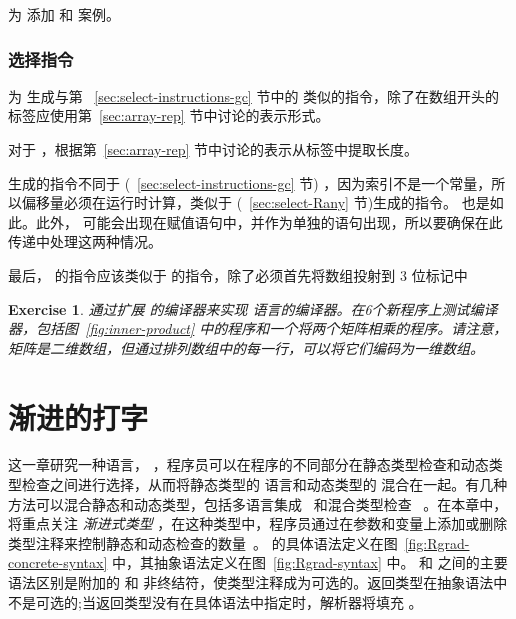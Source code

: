 \documentclass[11pt]{book}
\newtheorem{exercise}[theorem]{Exercise}
\begin{document}
为  添加  和  案例。

\subsection{选择指令}

为  生成与第 ~\ref{sec:select-instructions-gc} 节中的
 类似的指令，除了在数组开头的标签应使用第~\ref{sec:array-rep} 节中讨论的表示形式。

对于  ，根据第~\ref{sec:array-rep} 节中讨论的表示从标签中提取长度。

  生成的指令不同于  (~\ref{sec:select-instructions-gc} 节) ，因为索引不是一个常量，所以偏移量必须在运行时计算，类似于
 (~\ref{sec:select-Rany} 节)生成的指令。  也是如此。此外，  可能会出现在赋值语句中，并作为单独的语句出现，所以要确保在此传递中处理这两种情况。

最后，  的指令应该类似于  的指令，除了必须首先将数组投射到 $3$ 位标记中

\begin{exercise}\normalfont

通过扩展 \LangLoop{} 的编译器来实现 \LangArray{} 语言的编译器。在6个新程序上测试编译器，包括图~\ref{fig:inner-product} 中的程序和一个将两个矩阵相乘的程序。请注意，矩阵是二维数组，但通过排列数组中的每一行，可以将它们编码为一维数组。
  
\end{exercise}


\chapter{渐进的打字}
\label{ch:Rgrad}

这一章研究一种语言， \LangGrad{} ，程序员可以在程序的不同部分在静态类型检查和动态类型检查之间进行选择，从而将静态类型的 \LangLoop{} 语言和动态类型的 \LangDyn{} 混合在一起。有几种方法可以混合静态和动态类型，包括多语言集成~\citep{Tobin-Hochstadt:2006fk,Matthews:2007zr} 和混合类型检查~\citep{Flanagan:2006mn,Gronski:2006uq} 。在本章中，将重点关注 \emph{渐进式类型} ，在这种类型中，程序员通过在参数和变量上添加或删除类型注释来控制静态和动态检查的数量~\citep{Anderson:2002kd,Siek:2006bh}。
%
 \LangGrad{} 的具体语法定义在图~\ref{fig:Rgrad-concrete-syntax} 中，其抽象语法定义在图~\ref{fig:Rgrad-syntax} 中。
\LangLoop{} 和 \LangGrad{} 之间的主要语法区别是附加的  和 
非终结符，使类型注释成为可选的。返回类型在抽象语法中不是可选的;当返回类型没有在具体语法中指定时，解析器将填充
。
\end{document}
